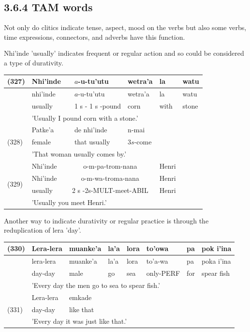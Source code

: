 \documentclass[10pt]{article}
\begin{document}
\subsection*{3.6.4 TAM words}
Not only do clitics indicate tense, aspect, mood on the verbs but also some verbs, time expressions, connectors, and adverbs have this function.

Nhi'inde 'usually' indicates frequent or regular action and so could be considered a type of durativity.

\begin{center}
\begin{tabular}{|l|l|l|l|l|l|l|}
\hline
\multirow[t]{4}{*}{(327)} & Nhi'inde &  & \(a\)-u-tu'utu & wetra'a & la & watu \\
\hline
 & nhi'inde &  & \(a\)-u-tu'utu & wetra'a & la & watu \\
\hline
 & usually &  & 1 s - 1 s -pound & corn & with & stone \\
\hline
 & \multicolumn{6}{|l|}{'Usually I pound corn with a stone.'} \\
\hline
\multirow[t]{3}{*}{(328)} & Patke'a &  & de nhi'inde & n-mai &  &  \\
\hline
 & female &  & that usually & \(3 s\)-come &  &  \\
\hline
 & \multicolumn{5}{|l|}{'That woman usually comes by.'} &  \\
\hline
\multirow[t]{4}{*}{(329)} & Nhi'inde & \multicolumn{3}{|c|}{o-m-pa-trom-nana} & Henri &  \\
\hline
 & Nhi'inde & \multicolumn{3}{|c|}{o-m-wa-troma-nana} & Henri &  \\
\hline
 & usually & \multicolumn{3}{|c|}{2 s -2s-MULT-meet-ABIL} & Henri &  \\
\hline
 & \multicolumn{6}{|l|}{'Usually you meet Henri.'} \\
\hline
\end{tabular}
\end{center}

Another way to indicate durativity or regular practice is through the reduplication of lera 'day'.

\begin{center}
\begin{tabular}{|l|l|l|l|l|l|l|l|}
\hline
\multirow[t]{4}{*}{(330)} & Lera-lera & muanke'a & la'a & lora & to'owa & pa & pok i'ina \\
\hline
 & lera-lera & muanke'a & la'a & lora & to'a-wa & pa & poka i'ina \\
\hline
 & day-day & male & go & sea & only-PERF & for & spear fish \\
\hline
 & \multicolumn{7}{|l|}{'Every day the men go to sea to spear fish.'} \\
\hline
\multirow[t]{3}{*}{(331)} & Lera-lera & emkade &  &  &  &  &  \\
\hline
 & day-day & like that &  &  &  &  &  \\
\hline
 & \multicolumn{7}{|l|}{'Every day it was just like that.'} \\
\hline
\end{tabular}
\end{center}
\end{document}
